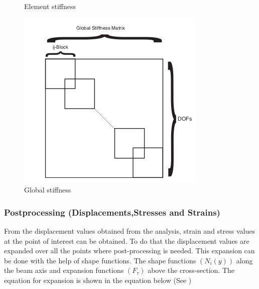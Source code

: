 \documentclass[a4paper,12pt]{article}
\begin{document}
\begin{figure}[!htbp]
\begin{minipage}[b]{0.35\textwidth}
    \caption{Element stiffness}
    \label{Elemental}
  \end{minipage}
  \hfill
  \begin{minipage}[b]{0.35\textwidth}
    \includegraphics[width=\textwidth]{5.png}
    \caption{Global stiffness}
    \label{Global}
  \end{minipage}
\end{figure}


\subsubsection*{Postprocessing (Displacements,Stresses and Strains)}
\indent\indent\indent From the displacement values obtained from the analysis,  strain and stress values at the point of interest can be obtained. To do that the displacement values are expanded over all the points where post-processing is needed. This expansion can be done with the help of shape functions. The shape functions $(N_{i}(y))$ along the beam axis and expansion functions $(F_{\tau})$ above the cross-section. The equation for expansion is shown in the equation below (See \cite{carrera2014finite})
\end{document}
